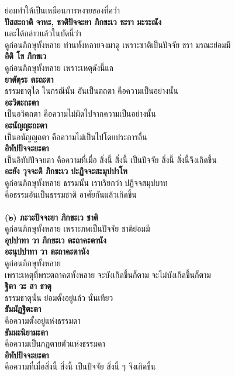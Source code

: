 \documentclass[12pt]{article}
\begin{document}
\indent ย่อมทำให้เป็นเหมือนการหงายของที่คว่ำ\\
\textbf{ปัสสะถาติ จาหะ, ชาติปัจจะยา ภิกขะเว ชะรา มะระณัง}\\
\indent และได้กล่าวแล้วในบัดนี้ว่า \\
\indent ดูก่อนภิกษุทั้งหลาย ท่านทั้งหลายจงมาดู เพราะชาติเป็นปัจจัย ชรา มรณะย่อมมี\\
\textbf{อิติ โข ภิกขเว}\\
\indent ดูก่อนภิกษุทั้งหลาย เพราะเหตุดังนี้แล\\
\textbf{ยาตัตฺระ ตะถะตา}\\
\indent ธรรมธาตุใด ในกรณีนั้น อันเป็นตถตา คือความเป็นอย่างนั้น\\
\textbf{อะวิตะถะตา}\\
\indent เป็นอวิตถตา คือความไม่ผิดไปจากความเป็นอย่างนั้น\\
\textbf{อะนัญญะถะตา}\\
\indent เป็นอนัญญถตา คือความไม่เป็นไปโดยประการอื่น\\
\textbf{อิทัปปัจจะยะตา}\\
\indent เป็นอิทัปปัจจยตา คือความที่เมื่อ สิ่งนี้ สิ่งนี้ เป็นปัจจัย สิ่งนี้ สิ่งนี้จึงเกิดขึ้น\\
\textbf{อะยัง วุจจะติ ภิกขะเว ปะฏิจจะสะมุปปาโท}\\
\indent ดูก่อนภิกษุทั้งหลาย ธรรมนั้น เราเรียกว่า ปฏิจจสมุปบาท\\
\indent คือธรรมอันเป็นธรรมชาติ อาศัยกันแล้วเกิดขึ้น\\
\\
\textbf{(๒) ภะวะปัจจะยา ภิกขะเว ชาติ}\\
\indent ดูก่อนภิกษุทั้งหลาย เพราะภพเป็นปัจจัย ชาติย่อมมี\\
\textbf{อุปปาทา วา ภิกขะเว ตะถาคะตานัง\\
อะนุปปาทา วา ตะถาคะตานัง}\\
\indent ดูก่อนภิกษุทั้งหลาย\\
\indent เพราะเหตุที่พระตถาคตทั้งหลาย จะบังเกิดขึ้นก็ตาม จะไม่บังเกิดขึ้นก็ตาม\\
\textbf{ฐิตา วะ สา ธาตุ}\\
\indent ธรรมธาตุนั้น ย่อมตั้งอยู่แล้ว นั่นเทียว\\
\textbf{ธัมมัฏฐิตะตา}\\
\indent คือความตั้งอยู่แห่งธรรมดา\\
\textbf{ธัมมะนิยามะตา}\\
\indent คือความเป็นกฎตายตัวแห่งธรรมดา\\
\textbf{อิทัปปัจจะยะตา}\\
\indent คือความที่เมื่อสิ่งนี้ สิ่งนี้ เป็นปัจจัย สิ่งนี้ ๆ จึงเกิดขึ้น\\
\end{document}
